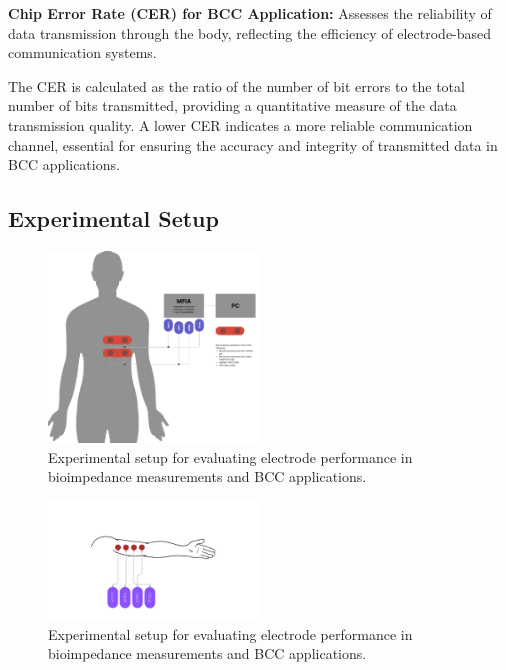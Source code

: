 \documentclass[conference]{IEEEtran}
\begin{document}
\textbf{Chip Error Rate (CER) for BCC Application:} Assesses the reliability of data transmission through the body, reflecting the efficiency of electrode-based communication systems.
    
    The CER is calculated as the ratio of the number of bit errors to the total number of bits transmitted, providing a quantitative measure of the data transmission quality. A lower CER indicates a more reliable communication channel, essential for ensuring the accuracy and integrity of transmitted data in BCC applications.
    


\subsection{Experimental Setup}
\begin{figure}[!ht]
    \centering
    \includegraphics[width=0.5\textwidth]{figures/experimentSetup.png}
    \caption{Experimental setup for evaluating electrode performance in bioimpedance measurements and BCC applications.}
    \label{fig:experimental_setup}
\end{figure}

\begin{figure}
    \centering
    \includegraphics[width=0.5\textwidth]{figures/experimentSetup_upper_arm.jpeg}
    \caption{Experimental setup for evaluating electrode performance in bioimpedance measurements and BCC applications.}
    \label{fig:experimental_setup_upper_arm}
\end{figure}
\end{document}
